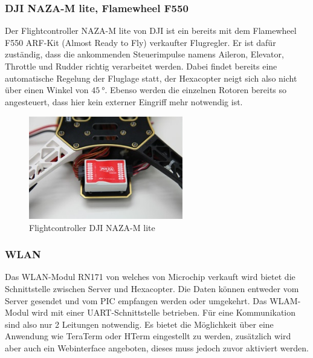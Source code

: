     \subsubsection{DJI NAZA-M lite, Flamewheel F550}
    Der Flightcontroller NAZA-M lite von DJI ist ein bereits mit dem Flamewheel F550 ARF-Kit (Almost Ready to Fly) verkaufter Flugregler.
    Er ist dafür zuständig, dass die ankommenden Steuerimpulse namens Aileron, Elevator, Throttle und Rudder richtig verarbeitet werden.
    Dabei findet bereits eine automatische Regelung der Fluglage statt, der Hexacopter neigt sich also nicht \zB über einen Winkel von $\SI{45}{\degree}$.
    Ebenso werden die einzelnen Rotoren bereits so angesteuert, dass hier kein externer Eingriff mehr notwendig ist.
    \begin{figure}[H]
      \begin{centering}
        \includegraphics[width = 0.6\textwidth]{Bilder/NAZA_M-lite}
      \par\end{centering}
      \caption[Flightcontroller DJI NAZA-M lite]{Flightcontroller DJI NAZA-M lite\cite{NAZA_M-lite}}
      \label{NAZA_M-lite}
    \end{figure}

    \subsubsection{WLAN}
    Das WLAN-Modul RN171 von welches von Microchip verkauft wird bietet die Schnittstelle zwischen Server und Hexacopter. Die Daten können entweder vom Server gesendet
    und vom PIC empfangen werden oder umgekehrt.
    Das WLAM-Modul wird mit einer UART-Schnittstelle betrieben. Für eine Kommunikation sind also nur 2 Leitungen notwendig.
    Es bietet die Möglichkeit über eine Anwendung wie TeraTerm oder HTerm eingestellt zu werden, zusätzlich wird aber auch ein Webinterface angeboten, dieses muss jedoch zuvor
    aktiviert werden.

